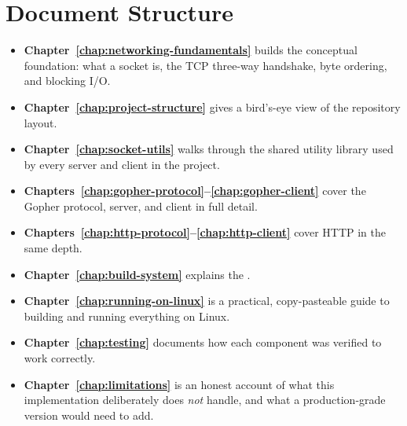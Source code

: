 \section{Document Structure}

\begin{itemize}
    \item \textbf{Chapter~\ref{chap:networking-fundamentals}} builds the conceptual foundation: what a socket is, the TCP three-way handshake, byte ordering, and blocking I/O.
    \item \textbf{Chapter~\ref{chap:project-structure}} gives a bird's-eye view of the repository layout.
    \item \textbf{Chapter~\ref{chap:socket-utils}} walks through the shared utility library used by every server and client in the project.
    \item \textbf{Chapters~\ref{chap:gopher-protocol}--\ref{chap:gopher-client}} cover the Gopher protocol, server, and client in full detail.
    \item \textbf{Chapters~\ref{chap:http-protocol}--\ref{chap:http-client}} cover HTTP in the same depth.
    \item \textbf{Chapter~\ref{chap:build-system}} explains the .
    \item \textbf{Chapter~\ref{chap:running-on-linux}} is a practical, copy-pasteable guide to building and running everything on Linux.
    \item \textbf{Chapter~\ref{chap:testing}} documents how each component was verified to work correctly.
    \item \textbf{Chapter~\ref{chap:limitations}} is an honest account of what this implementation deliberately does \emph{not} handle, and what a production-grade version would need to add.
\end{itemize}
